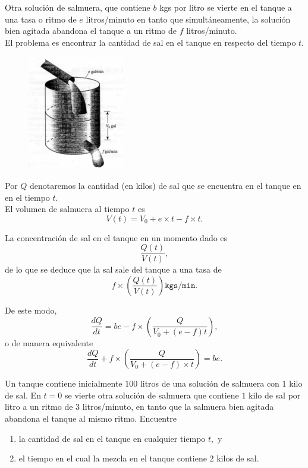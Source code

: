	Otra solución de salmuera, que contiene $b$ kgs por litro se vierte en el tanque a una tasa o ritmo de $e$ litros/minuto en tanto que simultáneamente, la solución bien agitada abandona el tanque a un ritmo de $f$ litros/minuto.\\
	
	El problema es encontrar la cantidad de sal en el tanque en respecto del tiempo $t.$



	\begin{figure}
		\centering
		\includegraphics[height=5cm,keepaspectratio=true]{./edo/img020506.png}
		\label{fig:020506}
	\end{figure}
	




	Por $Q$ denotaremos la cantidad (en kilos) de sal que se encuentra en el tanque en en el tiempo $t.$\\
	
	El volumen de salmuera al tiempo $t$ es
	\[
		\label{bron:7.7}
		V(t)=V_{0}+e\times t-f\times t.
	\]
	



	La concentración de sal en el tanque en un momento dado es $$\dfrac{Q(t)}{V(t)},$$ de lo que se deduce que la sal sale del tanque a una tasa de
	$$
	f \times \left( \dfrac{Q(t)}{V(t)} \right)
	\texttt{kgs/min.}
	$$



	De este modo,
	$$
	\dfrac{dQ}{dt}=be-f\times \left( \dfrac{Q}{V_{0}+(e-f)t} \right),
	$$
	o de manera equivalente
	\[
		\label{bron:7.8}
		\dfrac{dQ}{dt}+f \times \left( \dfrac{Q}{V_{0}+(e-f)\times t} \right)=be.
	\]
	



	\begin{problema}
		\label{bron:exmp:7.17}
		Un tanque contiene inicialmente $100$ litros de una solución de salmuera con $1$ kilo de sal. En $t=0$ se vierte otra solución de salmuera que contiene $1$ kilo de sal por litro a un ritmo de $3$ litros/minuto, en tanto que la salmuera bien agitada abandona el tanque al mismo ritmo. Encuentre
		\begin{enumerate}
			\item la cantidad de sal en el tanque en cualquier tiempo $t,$ y
			\item el tiempo en el cual la mezcla en el tanque contiene 2 kilos de sal.
		\end{enumerate}
		
	\end{problema}
	



